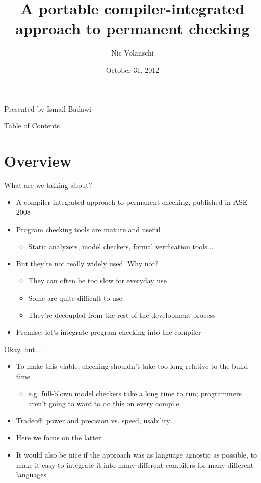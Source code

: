\documentclass{beamer}
\title[A portable compiler-integrated approach to permanent checking]
{A portable compiler-integrated approach to permanent checking}
\date{October 31, 2012}
\author[Nic Volanschi]{Nic Volanschi}
\begin{document}

\begin{frame}
\nocite{NV}
\nocite{Unparsed}
\nocite{Condate}
\titlepage
\begin{center}
Presented by Ismail Badawi
\end{center}
\end{frame}

\begin{frame}{Table of Contents}
\tableofcontents
\end{frame}

\section{Overview}
\begin{frame}{What are we talking about?}
\begin{itemize}
\item A compiler integrated approach to permanent checking, published in ASE 2008
\item Program checking tools are mature and useful
\begin{itemize}
\item Static analyzers, model checkers, formal verification tools...
\end{itemize}
\item But they're not really widely used. Why not?
\begin{itemize}
\item They can often be too slow for everyday use
\item Some are quite difficult to use
\item They're decoupled from the rest of the development process
\end{itemize}
\item Premise: let's integrate program checking into the compiler
\end{itemize}
\end{frame}

\begin{frame}{Okay, but...}
\begin{itemize}
\item To make this viable, checking shouldn't take too long relative to
the build time
\begin{itemize}
\item e.g. full-blown model checkers take a long time to run; 
programmers aren't going to want to do this on every compile
\end{itemize}
\item Tradeoff: power and precision vs. speed, usability
\item Here we focus on the latter
\item It would also be nice if the approach was as language agnostic as
possible, to make it easy to integrate it into many different compilers
for many different languages
\end{itemize}
\end{frame}
\end{document}
